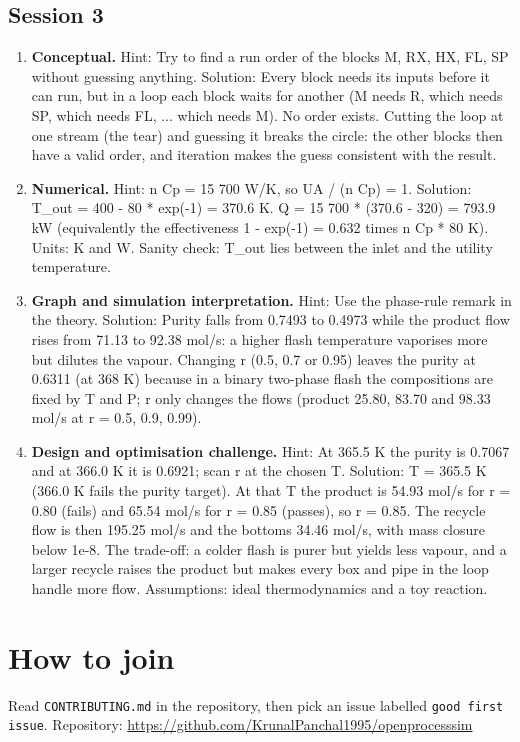 \documentclass[11pt,a4paper]{article}
\begin{document}
\subsection*{Session 3}
\begin{enumerate}[nosep]
\item \textbf{Conceptual.} Hint: Try to find a run order of the blocks M, RX, HX, FL, SP without guessing anything. Solution: Every block needs its inputs before it can run, but in a loop each block waits for another (M needs R, which needs SP, which needs FL, ... which needs M). No order exists. Cutting the loop at one stream (the tear) and guessing it breaks the circle: the other blocks then have a valid order, and iteration makes the guess consistent with the result.
\item \textbf{Numerical.} Hint: n Cp = 15 700 W/K, so UA / (n Cp) = 1. Solution: T\_out = 400 - 80 * exp(-1) = 370.6 K. Q = 15 700 * (370.6 - 320) = 793.9 kW (equivalently the effectiveness 1 - exp(-1) = 0.632 times n Cp * 80 K). Units: K and W. Sanity check: T\_out lies between the inlet and the utility temperature.
\item \textbf{Graph and simulation interpretation.} Hint: Use the phase-rule remark in the theory. Solution: Purity falls from 0.7493 to 0.4973 while the product flow rises from 71.13 to 92.38 mol/s: a higher flash temperature vaporises more but dilutes the vapour. Changing r (0.5, 0.7 or 0.95) leaves the purity at 0.6311 (at 368 K) because in a binary two-phase flash the compositions are fixed by T and P; r only changes the flows (product 25.80, 83.70 and 98.33 mol/s at r = 0.5, 0.9, 0.99).
\item \textbf{Design and optimisation challenge.} Hint: At 365.5 K the purity is 0.7067 and at 366.0 K it is 0.6921; scan r at the chosen T. Solution: T = 365.5 K (366.0 K fails the purity target). At that T the product is 54.93 mol/s for r = 0.80 (fails) and 65.54 mol/s for r = 0.85 (passes), so r = 0.85. The recycle flow is then 195.25 mol/s and the bottoms 34.46 mol/s, with mass closure below 1e-8. The trade-off: a colder flash is purer but yields less vapour, and a larger recycle raises the product but makes every box and pipe in the loop handle more flow. Assumptions: ideal thermodynamics and a toy reaction.
\end{enumerate}

\section{How to join}
Read \texttt{CONTRIBUTING.md} in the repository, then pick an issue labelled \texttt{good first issue}. Repository: \url{https://github.com/KrunalPanchal1995/openprocesssim}
\end{document}
